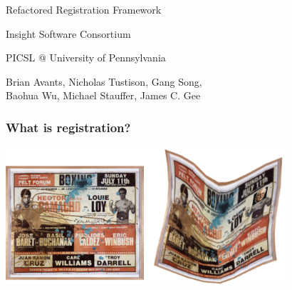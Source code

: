 {
\color{white}
\begin{frame}[plain]
\fontsize{36pt}{36pt}\selectfont
\center
\begin{center}
Refactored Registration Framework
\end{center}

\fontsize{12pt}{12pt}\selectfont
\begin{center}
Insight Software Consortium
\end{center}
\vskip12pt
\begin{center}
 PICSL @ University of Pennsylvania 
\end{center}
\vskip12pt
\begin{center}
 Brian Avants, Nicholas Tustison, Gang Song, \\ 
Baohua Wu, Michael Stauffer, James C. Gee
\end{center}
\end{frame}
}

\begin{frame}
\frametitle{What is registration?}
\includegraphics[height=2in]{../Art/RegistrationBasquiatWarp.pdf}
\end{frame}

